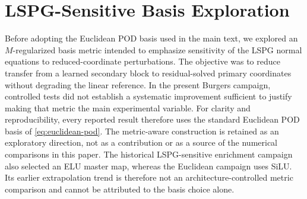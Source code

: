 \documentclass[11pt]{article}
\begin{document}
\appendix
\section{LSPG-Sensitive Basis Exploration}
\label{app:lspg-sensitive}
Before adopting the Euclidean POD basis used in the main text, we explored an
$M$-regularized basis metric intended to emphasize sensitivity of the LSPG
normal equations to reduced-coordinate perturbations.  The objective was to
reduce transfer from a learned secondary block to residual-solved primary
coordinates without degrading the linear reference.  In the present Burgers
campaign, controlled tests did not establish a systematic improvement
sufficient to justify making that metric the main experimental variable.  For
clarity and reproducibility, every reported result therefore uses the standard
Euclidean POD basis of \eqref{eq:euclidean-pod}.  The metric-aware
construction is retained as an exploratory direction, not as a contribution
or as a source of the numerical comparisons in this paper.  The historical
LSPG-sensitive enrichment campaign also selected an ELU master map, whereas
the Euclidean campaign uses SiLU.  Its earlier extrapolation trend is therefore
not an architecture-controlled metric comparison and cannot be attributed to
the basis choice alone.



\end{document}
